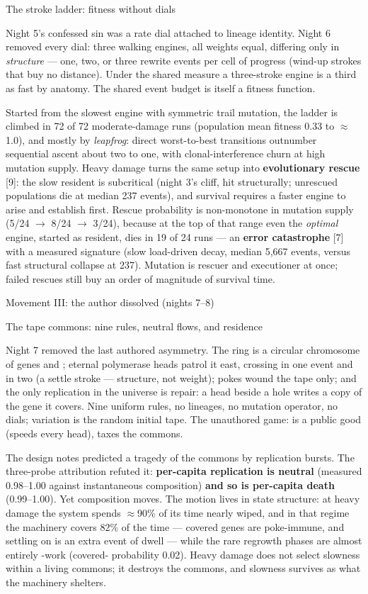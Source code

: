 \secc The stroke ladder: fitness without dials

Night 5's confessed sin was a rate dial attached to lineage
identity. Night 6 removed every dial: three walking engines, all
weights equal, differing only in {\it structure} --- one, two, or
three rewrite events per cell of progress (wind-up strokes that buy
no distance). Under the shared measure a three-stroke engine is a
third as fast by anatomy.  The shared event budget is
itself a fitness function.

Started from the slowest engine with symmetric trail mutation, the
ladder is climbed in 72 of 72 moderate-damage runs (population
mean fitness 0.33 to $\approx$1.0), and mostly by {\it leapfrog}:
direct worst-to-best transitions outnumber sequential ascent about
two to one, with clonal-interference churn at high mutation supply.
Heavy damage turns the same setup into {\bf evolutionary rescue}
[9]: the slow resident is subcritical (night 3's cliff, hit
structurally; unrescued populations die at median 237 events), and
survival requires a faster engine to arise and establish first.
Rescue probability is non-monotone in mutation supply
(5/24 $\to$ 8/24 $\to$ 3/24), because at the top of that range even
the {\it optimal} engine, started as resident, dies in 19 of 24
runs --- an {\bf error catastrophe} [7] with a measured signature
(slow load-driven decay, median 5{,}667 events, versus fast
structural collapse at 237). Mutation is rescuer and executioner at
once; failed rescues still buy an order of magnitude of survival
time.

\sec Movement III: the author dissolved (nights 7--8)

\secc The tape commons: nine rules, neutral flows, and residence

Night 7 removed the last authored asymmetry. The ring is a circular
chromosome of genes  and ; eternal polymerase heads patrol
it east, crossing  in one event and  in two (a settle
stroke --- structure, not weight); pokes wound the tape only; and
the only replication in the universe is repair: a head beside a
hole writes a copy of the gene it covers. Nine uniform rules, no
lineages, no mutation operator, no dials; variation is the random
initial tape. The unauthored game:  is a public good (speeds
every head),  taxes the commons.

The design notes predicted a tragedy of the commons by replication
bursts. The three-probe attribution refuted it: {\bf per-capita
replication is neutral} (measured 0.98--1.00 against instantaneous
composition) {\bf and so is per-capita death} (0.99--1.00). Yet
composition moves. The motion lives in state structure: at heavy
damage the system spends $\approx$90\% of its time nearly wiped, and
in that regime the machinery covers  82\% of the time ---
covered genes are poke-immune, and settling on  is an extra
event of dwell --- while the rare regrowth phases are almost
entirely -work (covered- probability 0.02). Heavy damage
does not select slowness within a living commons; it destroys the
commons, and slowness survives as what the machinery shelters.


